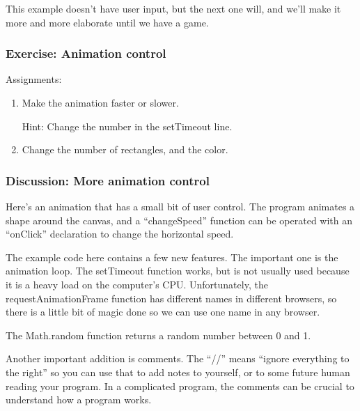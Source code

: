 \documentclass[11pt]{article}
\begin{document}
This example doesn't have user input, but the next one will, and we'll
make it more and more elaborate until we have a game.


\subsubsection{Exercise: Animation control}

Assignments:

\begin{enumerate}

\item Make the animation faster or slower.

Hint: Change the number in the setTimeout line.

\item Change the number of rectangles, and the color.

\end{enumerate}

\subsubsection{Discussion: More animation control}

Here's an animation that has a small bit of user control.  The program
animates a shape around the canvas, and a ``changeSpeed'' function can
be operated with an ``onClick'' declaration to change the horizontal
speed.

The example code here contains a few new features.  The important one
is the animation loop.  The setTimeout function works, but is not
usually used because it is a heavy load on the computer's CPU.
Unfortunately, the requestAnimationFrame function has different names
in different browsers, so there is a little bit of magic done so we
can use one name in any browser.

The Math.random function returns a random number between 0 and 1.

Another important addition is comments.  The ``//'' means ``ignore
everything to the right'' so you can use that to add notes to
yourself, or to some future human reading your program.  In a
complicated program, the comments can be crucial to understand how a
program works.
\end{document}
